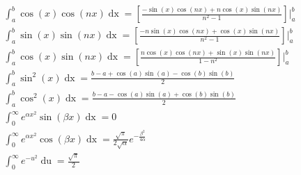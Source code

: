 \documentclass[fleqn]{article}
\begin{document}
\begin{gather*}
%
\int_{a}^{b}\cos{(x)}\cos{(nx)}\mathop{dx} =\left[\frac{-\sin{(x)}\cos{(nx)} + n\cos{(x)}\sin{(nx)}}{n^{2} - 1}\right]\Bigg|_{a}^{b}\\
%
\int_{a}^{b}\sin{(x)}\sin{(nx)}\mathop{dx} =\left[\frac{-n\sin{(x)}\cos{(nx)} + \cos{(x)}\sin{(nx)}}{n^{2} - 1}\right]\Bigg|_{a}^{b}\\
%
\int_{a}^{b}\cos{(x)}\sin{(nx)}\mathop{dx} =\left[\frac{n\cos{(x)}\cos{(nx)} + \sin{(x)}\sin{(nx)}}{1 - n^{2}}\right]\Bigg|_{a}^{b}\\
%
\int_{a}^{b}\sin^{2}{(x)}\mathop{dx} = \frac{b - a + \cos{(a)}\sin{(a)} - \cos{(b)}\sin{(b)}}{2}\\
%
\int_{a}^{b}\cos^{2}{(x)}\mathop{dx} = \frac{b - a - \cos{(a)}\sin{(a)} + \cos{(b)}\sin{(b)}}{2}\\
%
\int_{0}^{\infty}e^{\alpha x^{2}}\sin{(\beta x)}\mathop{dx} = 0\\
%
\int_{0}^{\infty}e^{\alpha x^{2}}\cos{(\beta x)}\mathop{dx} = \frac{\sqrt{\pi}}{2\sqrt{\alpha}}e^{-\frac{\beta^{2}}{4\alpha}}\\
%
\int_{0}^{\infty}e^{-u^{2}}\mathop{du} = \frac{\sqrt{\pi}}{2}\\
%
\end{gather*}
\end{document}
